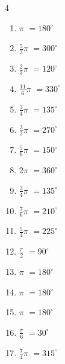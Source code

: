 \begin{multicols}{4}
\begin{enumerate}
  \item $\displaystyle \pi$
        $\displaystyle =180^{\circ}$

  \item $\displaystyle \frac{5}{3}\pi$
        $\displaystyle =300^{\circ}$

  \item $\displaystyle \frac{2}{3}\pi$
        $\displaystyle =120^{\circ}$

  \item $\displaystyle \frac{11}{6}\pi$
        $\displaystyle =330^{\circ}$

  \item $\displaystyle \frac{3}{4}\pi$
        $\displaystyle =135^{\circ}$

  \item $\displaystyle \frac{3}{2}\pi$
        $\displaystyle =270^{\circ}$

  \item $\displaystyle \frac{5}{6}\pi$
        $\displaystyle =150^{\circ}$

  \item $\displaystyle 2\pi$
        $\displaystyle =360^{\circ}$

  \item $\displaystyle \frac{3}{4}\pi$
        $\displaystyle =135^{\circ}$

  \item $\displaystyle \frac{7}{6}\pi$
        $\displaystyle =210^{\circ}$

  \item $\displaystyle \frac{5}{4}\pi$
        $\displaystyle =225^{\circ}$

  \item $\displaystyle \frac{\pi}{2}$
        $\displaystyle =90^{\circ}$

  \item $\displaystyle \pi$
        $\displaystyle =180^{\circ}$

  \item $\displaystyle \pi$
        $\displaystyle =180^{\circ}$

  \item $\displaystyle \pi$
        $\displaystyle =180^{\circ}$

\columnbreak %

\resetques

  \item $\displaystyle \frac{\pi}{6}$
        $\displaystyle =30^{\circ}$

  \item $\displaystyle \frac{7}{4}\pi$
        $\displaystyle =315^{\circ}$


\end{enumerate}
\end{multicols}
